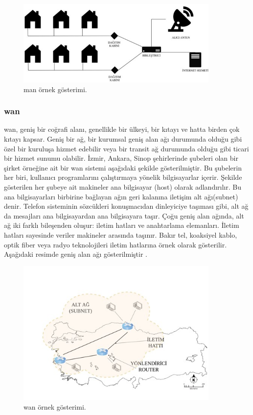 \begin{figure}[htbp]
\centerline{\includegraphics[width=10cm]{Resim/Sekil3-7.jpg}}
\caption{\gls{man} örnek gösterimi.}
\label{fig:figure13}
\end{figure}

\subsubsection{\gls{wan}}

\gls{wan}, geniş bir coğrafi alanı, genellikle bir ülkeyi, bir kıtayı ve hatta birden çok kıtayı kapsar. Geniş bir ağ, bir kurumsal geniş alan ağı durumunda olduğu gibi özel bir kuruluşa hizmet edebilir veya bir transit ağ durumunda olduğu gibi ticari bir hizmet sunumu olabilir.
İzmir, Ankara, Sinop şehirlerinde şubeleri olan bir şirket örneğine ait bir \gls{wan} sistemi aşağıdaki şekilde gösterilmiştir. Bu şubelerin her biri, kullanıcı programlarını çalıştırmaya yönelik bilgisayarlar içerir. Şekilde gösterilen her şubeye ait makineler ana bilgisayar (host) olarak adlandırılır. Bu ana bilgisayarları birbirine bağlayan ağın geri kalanına iletişim alt ağı(subnet) denir. Telefon sisteminin sözcükleri konuşmacıdan dinleyiciye taşıması gibi, alt ağ da mesajları ana bilgisayardan ana bilgisayara taşır.
Çoğu geniş alan ağında, alt ağ iki farklı bileşenden oluşur: iletim hatları ve anahtarlama elemanları. İletim hatları sayesinde veriler makineler arasında taşınır. Bakır tel, koaksiyel kablo, optik fiber veya radyo teknolojileri iletim hatlarına örnek olarak gösterilir. Aşağıdaki resimde geniş alan ağı gösterilmiştir \cite{tanenbaum2002computer}.

\begin{figure}[htbp]
\centerline{\includegraphics[width=10cm]{Resim/Sekil3-8.jpg}}
\caption{\gls{wan} örnek gösterimi.}
\label{fig:figure14}
\end{figure}


